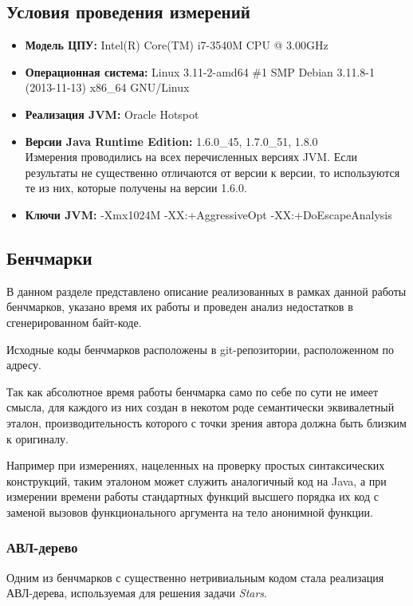 \subsection{Условия проведения измерений}
\begin{itemize}
    \item \textbf{Модель ЦПУ:} Intel(R) Core(TM) i7-3540M CPU @ 3.00GHz
    \item \textbf{Операционная система:} Linux 3.11-2-amd64 \#1 SMP Debian 3.11.8-1 (2013-11-13) x86\_64 GNU/Linux
    \item \textbf{Реализация JVM:} Oracle Hotspot
    \item \textbf{Версии Java Runtime Edition:} 1.6.0\_45, 1.7.0\_51, 1.8.0 \\
    Измерения проводились на всех перечисленных версиях JVM.
    Если результаты не существенно отличаются от версии к версии, то используются те из них,
    которые получены на версии 1.6.0.
    \item \textbf{Ключи JVM:} -Xmx1024M -XX:+AggressiveOpt -XX:+DoEscapeAnalysis
\end{itemize}

\subsection{Бенчмарки}
\label{section:benchmarks}
В данном разделе представлено описание реализованных в рамках данной работы бенчмарков, указано
время их работы и проведен анализ недостатков в сгенерированном байт-коде.

Исходные коды бенчмарков расположены в git-репозитории, расположенном по адресу\cite{Benchmark}.

Так как абсолютное время работы бенчмарка само по себе по сути не имеет смысла, для каждого из
них создан в некотом роде семантически эквивалетный эталон, производительность которого
с точки зрения автора должна быть близким к оригиналу.

Например при измерениях, нацеленных на проверку простых синтаксических конструкций, таким эталоном
может служить аналогичный код на Java, а при измерении времени работы стандартных функций высшего
порядка их код с заменой вызовов функционального аргумента на тело анонимной функции.

\subsubsection{АВЛ-дерево}
\label{section:avl:bm}
Одним из бенчмарков с существенно нетривиальным кодом стала реализация АВЛ-дерева, используемая
для решения задачи \textit{Stars}.

